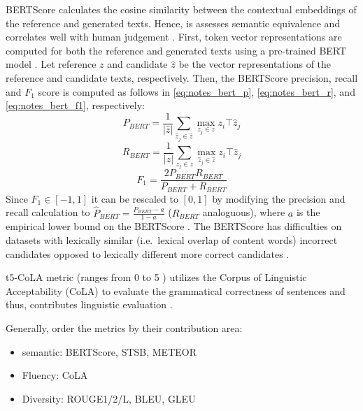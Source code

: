 BERTScore calculates the cosine similarity between the contextual embeddings of the reference and generated texts. 
Hence, is assesses semantic equivalence and correlates well with human judgement \citep{kurt_pehlivanoglu_comparative_2024}.
First, token vector representations are computed for both the reference and generated texts using a pre-trained BERT model \citep{hanna_fine_grained_2021}.
Let reference $z$ and candidate $\hat{z}$ be the vector representations of the reference and candidate texts, respectively.
Then, the BERTScore precision, recall and $F_1$ score is computed as follows in \autoref{eq:notes_bert_p}, \autoref{eq:notes_bert_r}, and \autoref{eq:notes_bert_f1}, respectively:
\begin{equation}
    P_{BERT} = \frac{1}{|\hat{z}|} \sum_{\hat{z}_j \in \hat{z}} \max_{z_j \in z} z_i\top \hat{z}_j
\label{eq:notes_bert_p}
\end{equation}
\begin{equation}
    R_{BERT} = \frac{1}{|z|} \sum_{z_j \in z} \max_{\hat{z}_j \in \hat{z}} z_i\top \hat{z}_j
\label{eq:notes_bert_r}
\end{equation}
\begin{equation}
    F_1 = \frac{2 P_{BERT} R_{BERT}}{P_{BERT} + R_{BERT}} 
\label{eq:notes_bert_f1}
\end{equation}
Since $F_1 \in \left[-1,1\right]$ it can be rescaled to $[0,1]$ by modifying the precision and recall calculation 
to $\hat{P}_{BERT} = \frac{P_{BERT} - a}{1 - a}$ ($R_{BERT}$ analoguous), where $a$ is the empirical lower bound on the BERTScore \citep{hanna_fine_grained_2021}.
The BERTScore has difficulties on datasets with lexically similar (i.e.\ lexical overlap of content words) incorrect candidates 
opposed to lexically different more correct candidates \citep{hanna_fine_grained_2021}.


\ac{t5}-CoLA metric (ranges from 0 to 5 \citep{kurt_pehlivanoglu_comparative_2024}) utilizes the Corpus of Linguistic Acceptability (CoLA) to evaluate the grammatical correctness of sentences and thus, 
contributes linguistic evaluation \citep{kurt_pehlivanoglu_comparative_2024}.

Generally, \citet{kurt_pehlivanoglu_comparative_2024} order the metrics by their contribution area:
\begin{itemize}
    \item semantic: BERTScore, STSB, METEOR
    \item Fluency: CoLA
    \item Diversity: ROUGE1/2/L, BLEU, GLEU
\end{itemize}

